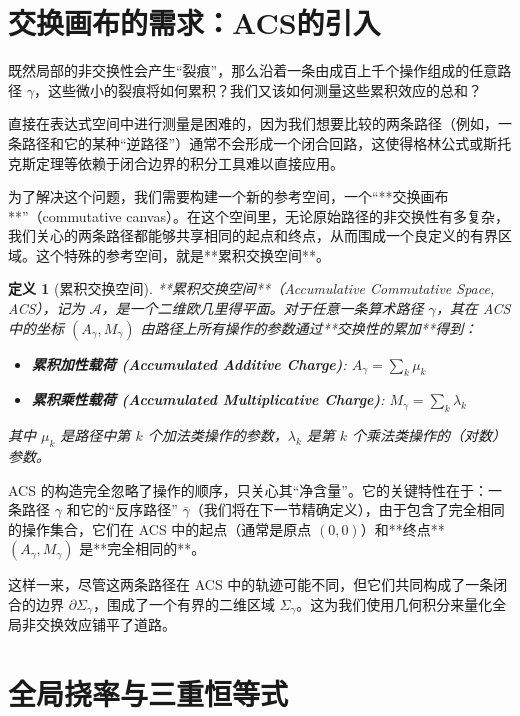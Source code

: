 \documentclass[a4paper,12pt]{book}
\numberwithin{problem}{section}
\newtheorem{definition}{定义}
\numberwithin{definition}{section}
\numberwithin{lemma}{section}
\numberwithin{proposition}{section}
\numberwithin{theorem}{section}
\numberwithin{grammar}{section}
\numberwithin{program}{section}
\numberwithin{convention}{section}
\numberwithin{corollary}{section}
\begin{document}
\section{交换画布的需求：ACS的引入}
\label{sec:introducing_acs}

既然局部的非交换性会产生“裂痕”，那么沿着一条由成百上千个操作组成的任意路径 $\gamma$，这些微小的裂痕将如何累积？我们又该如何测量这些累积效应的总和？

直接在表达式空间中进行测量是困难的，因为我们想要比较的两条路径（例如，一条路径和它的某种“逆路径”）通常不会形成一个闭合回路，这使得格林公式或斯托克斯定理等依赖于闭合边界的积分工具难以直接应用。

为了解决这个问题，我们需要构建一个新的参考空间，一个“**交换画布**”（commutative canvas）。在这个空间里，无论原始路径的非交换性有多复杂，我们关心的两条路径都能够共享相同的起点和终点，从而围成一个良定义的有界区域。这个特殊的参考空间，就是**累积交换空间**。

\begin{definition}[累积交换空间]
    \label{def:acs}
    **累积交换空间**（Accumulative Commutative Space, ACS），记为 $\mathcal{A}$，是一个二维欧几里得平面。对于任意一条算术路径 $\gamma$，其在 ACS 中的坐标 $(A_\gamma, M_\gamma)$ 由路径上所有操作的参数通过**交换性的累加**得到：
    \begin{itemize}
        \item \textbf{累积加性载荷 (Accumulated Additive Charge)}: $A_\gamma = \sum_k \mu_k$
        \item \textbf{累积乘性载荷 (Accumulated Multiplicative Charge)}: $M_\gamma = \sum_k \lambda_k$
    \end{itemize}
    其中 $\mu_k$ 是路径中第 $k$ 个加法类操作的参数，$\lambda_k$ 是第 $k$ 个乘法类操作的（对数）参数。
\end{definition}

ACS 的构造完全忽略了操作的顺序，只关心其“净含量”。它的关键特性在于：一条路径 $\gamma$ 和它的“反序路径” $\bar{\gamma}$（我们将在下一节精确定义），由于包含了完全相同的操作集合，它们在 ACS 中的起点（通常是原点 $(0,0)$）和**终点** $(A_\gamma, M_\gamma)$ 是**完全相同的**。

这样一来，尽管这两条路径在 ACS 中的轨迹可能不同，但它们共同构成了一条闭合的边界 $\partial\Sigma_\gamma$，围成了一个有界的二维区域 $\Sigma_\gamma$。这为我们使用几何积分来量化全局非交换效应铺平了道路。

\section{全局挠率与三重恒等式}
\label{sec:triple_identity}
\end{document}

